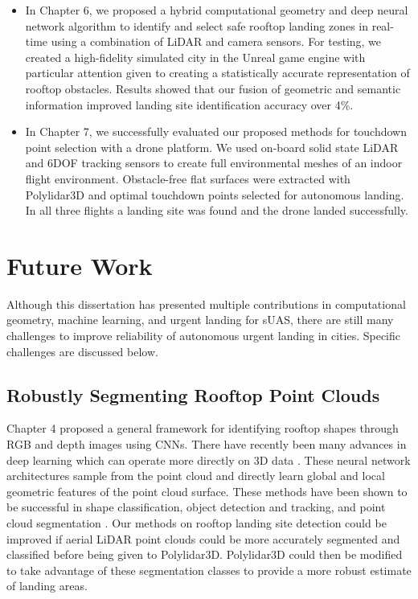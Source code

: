 \begin{itemize}
    \item In Chapter 6, we proposed a hybrid computational geometry and deep neural network algorithm to identify and select safe rooftop landing zones in real-time using a combination of LiDAR and camera sensors. For testing, we created a high-fidelity simulated city in the Unreal game engine with particular attention given to creating a statistically accurate representation of rooftop obstacles. Results showed that our fusion of geometric and semantic information improved landing site identification accuracy over 4\%.
    \item In Chapter 7, we successfully evaluated our proposed methods for touchdown point selection with a drone platform. We used on-board solid state LiDAR and 6DOF tracking sensors to create full environmental meshes of an indoor flight environment. Obstacle-free flat surfaces were extracted with Polylidar3D and optimal touchdown points selected for autonomous landing. In all three flights a landing site was found and the drone landed successfully.
\end{itemize}
\section{Future Work}

Although this dissertation has presented multiple contributions in computational geometry, machine learning, and urgent landing for \ac{sUAS}, there are still many challenges to improve reliability of autonomous urgent landing in cities.  Specific challenges are discussed below.

\subsection{Robustly Segmenting Rooftop Point Clouds}

Chapter 4 proposed a general framework for identifying rooftop shapes through RGB and depth images using CNNs. There have recently been many advances in deep learning which can operate more directly on 3D data \cite{qi_pointnet_2017-1, xu_spidercnn_2018, liu_dynamic_2019}. These neural network architectures sample from the point cloud and directly learn global and local geometric features of the point cloud surface. These methods have been shown to be successful in shape classification, object detection and tracking, and point cloud segmentation \cite{guo_deep_2020}. Our methods on rooftop landing site detection could be improved if aerial LiDAR point clouds could be more accurately segmented and classified before being given to Polylidar3D. Polylidar3D could then be modified to take advantage of these segmentation classes to provide a more robust estimate of landing areas.


